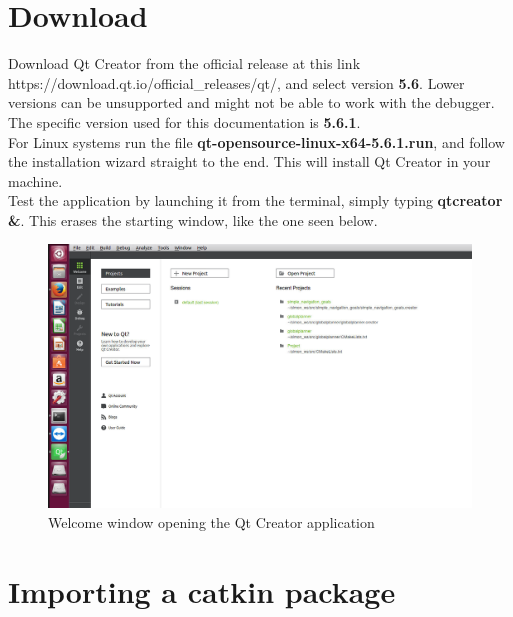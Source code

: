 \documentclass[11pt,a4paper]{article}
\begin{document}

%
%



\section{Download} \label{sec:down}

Download Qt Creator from the official release at this link https://download.qt.io/official{\_}releases/qt/, and select version \textbf{5.6}. Lower versions can be unsupported and might not be able to work with the debugger. The specific version used for this documentation is \textbf{5.6.1}.\\
For Linux systems run the file \textbf{qt-opensource-linux-x64-5.6.1.run}, and follow the installation wizard straight to the end. This will install Qt Creator in your machine. \\
Test the application by launching it from the terminal, simply typing \textbf{qtcreator \&}. This erases the starting window, like the one seen below.

\begin{figure}[!htb]
	\center
	\includegraphics[width=1\textwidth]{figures/welcome.png}
	\caption{Welcome window opening the Qt Creator application}
	\label{fig:welcome}
\end{figure}

\section{Importing a catkin package} \label{sec:open}
\end{document}
